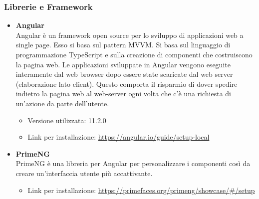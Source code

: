 \subsubsection{Librerie e Framework}

\begin{itemize}
	\item \textbf{Angular} \\
	Angular è un framework open source per lo sviluppo di applicazioni web a single page. Esso si basa sul pattern MVVM. Si basa sul linguaggio di programmazione TypeScript e sulla creazione di componenti che costruiscono la pagina web. Le applicazioni sviluppate in Angular vengono eseguite interamente dal web browser dopo essere state scaricate dal web server (elaborazione lato client). Questo comporta il risparmio di dover spedire indietro la pagina web al web-server ogni volta che c'è una richiesta di un'azione da parte dell'utente.
	\begin{itemize}
		\item Versione utilizzata: 11.2.0
		\item Link per installazione: \url{https://angular.io/guide/setup-local}
	\end{itemize}
 	\item \textbf{PrimeNG} \\
 	PrimeNG è una libreria per Angular per personalizzare i componenti così da creare un'interfaccia utente più accattivante.
	 \begin{itemize}
		\item Link per installazione: \url{https://primefaces.org/primeng/showcase/#/setup}
	\end{itemize}

	
\end{itemize}